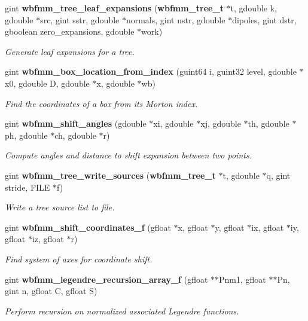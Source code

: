 \begin{DoxyCompactItemize}
gint {\bf wbfmm\+\_\+tree\+\_\+leaf\+\_\+expansions} ({\bf wbfmm\+\_\+tree\+\_\+t} $\ast$t, gdouble k, gdouble $\ast$src, gint sstr, gdouble $\ast$normals, gint nstr, gdouble $\ast$dipoles, gint dstr, gboolean zero\+\_\+expansions, gdouble $\ast$work)
\begin{DoxyCompactList}\small\item\em Generate leaf expansions for a tree. \end{DoxyCompactList}\item 
gint {\bf wbfmm\+\_\+box\+\_\+location\+\_\+from\+\_\+index} (guint64 i, guint32 level, gdouble $\ast$x0, gdouble D, gdouble $\ast$x, gdouble $\ast$wb)
\begin{DoxyCompactList}\small\item\em Find the coordinates of a box from its Morton index. \end{DoxyCompactList}\item 
gint {\bf wbfmm\+\_\+shift\+\_\+angles} (gdouble $\ast$xi, gdouble $\ast$xj, gdouble $\ast$th, gdouble $\ast$ph, gdouble $\ast$ch, gdouble $\ast$r)
\begin{DoxyCompactList}\small\item\em Compute angles and distance to shift expansion between two points. \end{DoxyCompactList}\item 
gint {\bf wbfmm\+\_\+tree\+\_\+write\+\_\+sources} ({\bf wbfmm\+\_\+tree\+\_\+t} $\ast$t, gdouble $\ast$q, gint stride, F\+I\+L\+E $\ast$f)
\begin{DoxyCompactList}\small\item\em Write a tree source list to file. \end{DoxyCompactList}\item 
gint {\bf wbfmm\+\_\+shift\+\_\+coordinates\+\_\+f} (gfloat $\ast$x, gfloat $\ast$y, gfloat $\ast$ix, gfloat $\ast$iy, gfloat $\ast$iz, gfloat $\ast$r)
\begin{DoxyCompactList}\small\item\em Find system of axes for coordinate shift. \end{DoxyCompactList}\item 
gint {\bf wbfmm\+\_\+legendre\+\_\+recursion\+\_\+array\+\_\+f} (gfloat $\ast$$\ast$Pnm1, gfloat $\ast$$\ast$Pn, gint n, gfloat C, gfloat S)
\begin{DoxyCompactList}\small\item\em Perform recursion on normalized associated Legendre functions. \end{DoxyCompactList}\item 

\end{DoxyCompactItemize}
